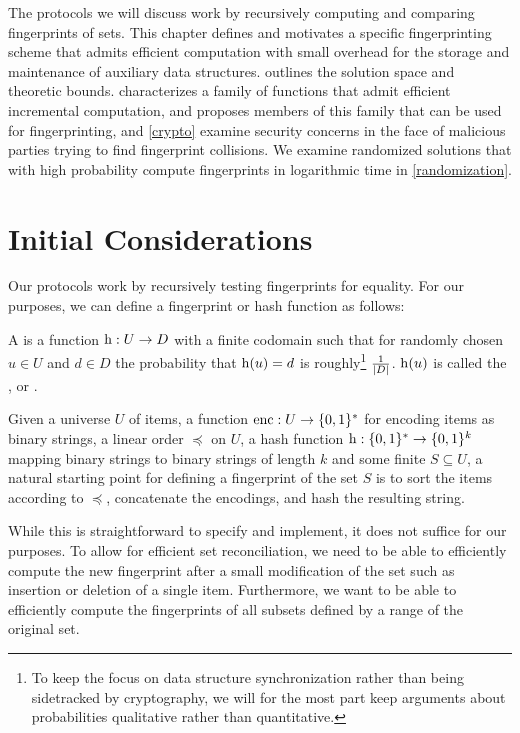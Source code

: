 
The protocols we will discuss work by recursively computing and comparing fingerprints of sets.
This chapter defines and motivates a specific fingerprinting scheme that admits efficient computation with small overhead for the storage and maintenance of auxiliary data structures.  outlines the solution space and theoretic bounds.  characterizes a family of functions that admit efficient incremental computation, and  proposes members of this family that can be used for fingerprinting, and \cref{crypto} examine security concerns in the face of malicious parties trying to find fingerprint collisions. We examine randomized solutions that with high probability compute fingerprints in logarithmic time in \cref{randomization}.

\section{Initial Considerations}
\label{initial-considerations}

Our protocols work by recursively testing fingerprints for equality. For our purposes, we can define a fingerprint or hash function as follows:

\begin{definition}
A  is a function ${\operatorname{h}}: {U} \rightarrow {D}$ with a finite codomain such that for randomly chosen $u \in U$ and $d \in D$ the probability that $\operatorname{h}(u) = d$ is roughly\footnote{To keep the focus on data structure synchronization rather than being sidetracked by cryptography, we will for the most part keep arguments about probabilities qualitative rather than quantitative.} $\frac{1}{|{D}|}$. $\operatorname{h}(u)$ is called the ,  or .
\end{definition}

Given a universe $U$ of items, a function $\operatorname{enc} : U \rightarrow \{0, 1\}^{*}$ for encoding items as binary strings, a linear order $\preceq$ on $U$, a hash function $\operatorname{h}: \{0, 1\}^{*} \rightarrow \{0, 1\}^{k}$ mapping binary strings to binary strings of length $k$ and some finite $S \subseteq U$, a natural starting point for defining a fingerprint of the set $S$ is to sort the items according to $\preceq$, concatenate the encodings, and hash the resulting string.

While this is straightforward to specify and implement, it does not suffice for our purposes. To allow for efficient set reconciliation, we need to be able to efficiently compute the new fingerprint after a small modification of the set such as insertion or deletion of a single item. Furthermore, we want to be able to efficiently compute the fingerprints of all subsets defined by a range of the original set.

